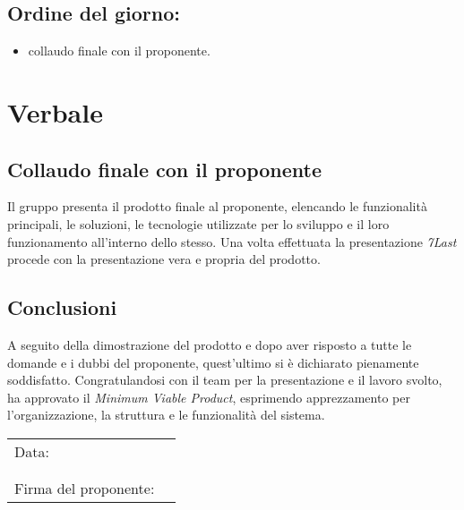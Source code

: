 \documentclass[italian,12pt]{article}
\begin{document}
\subsection*{Ordine del giorno:}
\begin{itemize}
	\item collaudo finale con il proponente.
\end{itemize}

\newpage

\section{Verbale}
\subsection{Collaudo finale con il proponente}
Il gruppo presenta il prodotto finale al proponente, elencando le funzionalità principali, le soluzioni, le tecnologie utilizzate per lo sviluppo e il loro funzionamento all'interno dello stesso. Una volta effettuata la presentazione \textit{7Last} procede con la presentazione vera e propria del prodotto. 

\subsection{Conclusioni}
A seguito della dimostrazione del prodotto e dopo aver risposto a tutte le domande e i dubbi del proponente, quest'ultimo si è dichiarato pienamente soddisfatto. Congratulandosi con il team per la presentazione e il lavoro svolto, ha approvato il \textit{Minimum Viable Product}, esprimendo apprezzamento per l'organizzazione, la struttura e le funzionalità del sistema.
\begin{table}[b]
	\begin{tabular}{@{}p{5cm}p{10cm}@{}}
		Data:                 & \hrulefill \\
		                      &            \\
		                      &            \\
		Firma del proponente: & \hrulefill \\
	\end{tabular}
\end{table}
\end{document}

